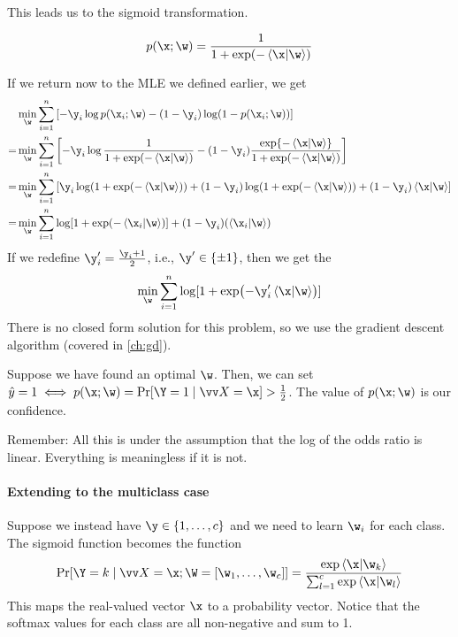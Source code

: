 \documentclass[class=cs480,notes,tikz]{agony}
\begin{document}
This leads us to the sigmoid transformation.
\begin{defn}
  \[p(\x;\w) = \frac{1}{1+\exp(-\ip{\x}{\w})}\]
\end{defn}

If we return now to the MLE we defined earlier, we get
\begin{align*}
    & \min_{\w}\sum_{i=1}^n\qty[-\y_i\log p(\x_i;\w)-(1-\y_i)\log(1-p(\x_i;\w))]                                                   \\
  = & \min_{\w}\sum_{i=1}^n\qty[-\y_i\log \frac{1}{1+\exp(-\ip{\x}{\w})} -(1-\y_i)\frac{\exp{-\ip{\x}{\w}}}{1+\exp(-\ip{\x}{\w})}] \\
  = & \min_{\w}\sum_{i=1}^n\qty[\y_i\log(1+\exp(-\ip{\x}{\w}))+(1-\y_i)\log(1+\exp(-\ip{\x}{\w})) + (1-\y_i)\ip{\x}{\w}]           \\
  = & \min_{\w}\sum_{i=1}^n \log[1+\exp(-\ip{\x_i}{\w})] + (1-\y_i)(\ip{\x_i}{\w})
\end{align*}
If we redefine $\y'_i = \frac{\y_i+1}{2}$, i.e., $\y' \in \{\pm1\}$,
then we get the 
\begin{equation}\label{eq:lgr}
  \min_{\w} \sum_{i=1}^n \log[1+\exp(-\y'_i\ip{\x}{\w})]
\end{equation}
There is no closed form solution for this problem,
so we use the gradient descent algorithm (covered in \cref{ch:gd}).

Suppose we have found an optimal $\w$.
Then, we can set $\hat y = 1 \iff p(\x;\w) = \Pr[\Y=1\mid\vv X=\x] > \frac12$.
The value of $p(\x;\w)$ is our confidence.

Remember: All this is under the assumption that the log of the odds ratio is linear.
Everything is meaningless if it is not.

\paragraph{Extending to the multiclass case}
Suppose we instead have $\y \in \{1,\dotsc,c\}$ and we need to learn $\w_i$ for each class.
The sigmoid function becomes the  function
\begin{equation}\label{eq:softmax}
  \Pr[\Y = k \mid \vv X = \x; \W = [\w_1,\dotsc,\w_c]]
  = \frac{\exp\ip{\x}{\w_k}}{\sum_{l=1}^c\exp\ip{\x}{\w_l}}
\end{equation}
This maps the real-valued vector $\x$ to a probability vector.
Notice that the softmax values for each class are all non-negative and sum to 1.
\end{document}
